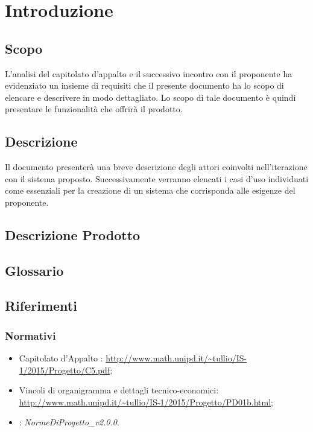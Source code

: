 \documentclass[12pt,a4paper]{article}
\begin{document}
\section{Introduzione}

\subsection{Scopo}
L’analisi del capitolato d’appalto e il successivo incontro con il proponente ha evidenziato un insieme di requisiti che il presente documento ha lo scopo di elencare e descrivere in modo dettagliato. Lo scopo di tale documento è quindi presentare le funzionalità che offrirà il prodotto.

\subsection{Descrizione}
Il documento presenterà una breve descrizione degli attori coinvolti nell'iterazione con il sistema proposto. Successivamente verranno elencati i casi d'uso individuati come essenziali per la creazione di un sistema che corrisponda alle esigenze del proponente.

\subsection{Descrizione Prodotto}
\descrizioneProdotto

\subsection{Glossario}\label{glossario}
\glossarioPrint

\subsection{Riferimenti}\label{riferimenti}
\subsubsection{Normativi}
\begin{itemize}
	\item Capitolato d’Appalto \prjL: \url{http://www.math.unipd.it/~tullio/IS-1/2015/Progetto/C5.pdf};
	\item Vincoli di organigramma e dettagli tecnico-economici: \url{http://www.math.unipd.it/~tullio/IS-1/2015/Progetto/PD01b.html};
	\item \NdP: \textit{NormeDiProgetto\_v2.0.0}. 
\end{itemize}
\newpage
\end{document}
